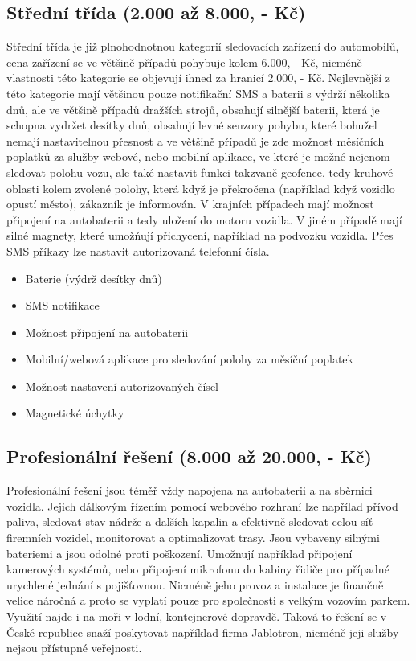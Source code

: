 \documentclass[FM,BP]{tulthesis}
\begin{document}
\subsection{Střední třída (2.000 až 8.000, - Kč)}
Střední třída je již plnohodnotnou kategorií sledovacích zařízení do automobilů, cena zařízení se ve většině případů pohybuje kolem 6.000, - Kč, nicméně vlastnosti této kategorie se objevují ihned za hranicí 2.000, - Kč. Nejlevnější z této kategorie mají většinou pouze notifikační SMS a baterii s výdrží několika dnů, ale ve většině případů dražších strojů, obsahují silnější baterii, která je schopna vydržet desítky dnů, obsahují levné senzory pohybu, které bohužel nemají nastavitelnou přesnost a ve většině případů je zde možnost měsíčních poplatků za služby webové, nebo mobilní aplikace, ve které je možné nejenom sledovat polohu vozu, ale také nastavit funkci takzvaně geofence, tedy kruhové oblasti kolem zvolené polohy, která když je překročena (například když vozidlo opustí město), zákazník je informován. V krajních případech mají možnost připojení na autobaterii a tedy uložení do motoru vozidla. V jiném případě mají silné magnety, které umožňují přichycení, například na podvozku vozidla. Přes SMS příkazy lze nastavit autorizovaná telefonní čísla.

\begin{itemize}
\item Baterie (výdrž desítky dnů)
\item SMS notifikace
\item Možnost připojení na autobaterii
\item Mobilní/webová aplikace pro sledování polohy za měsíční poplatek
\item Možnost nastavení autorizovaných čísel
\item Magnetické úchytky
\end{itemize}

\subsection{Profesionální řešení (8.000 až 20.000, - Kč)}
Profesionální řešení jsou téměř vždy napojena na autobaterii a na sběrnici vozidla. Jejich dálkovým řízením pomocí webového rozhraní lze napřílad přívod paliva, sledovat stav nádrže a dalších kapalin a efektivně sledovat celou síť firemních vozidel, monitorovat a optimalizovat trasy. Jsou vybaveny silnými bateriemi a jsou odolné proti poškození. Umožnují například připojení kamerových systémů, nebo připojení mikrofonu do kabiny řidiče pro případné urychlené jednání s pojišťovnou. Nicméně jeho provoz a instalace je finančně velice náročná a proto se vyplatí pouze pro společnosti s velkým vozovím parkem. Využití najde i na moři v lodní, kontejnerové dopravdě. Taková to řešení se v České republice snaží poskytovat například firma Jablotron, nicméně jeji služby nejsou přístupné veřejnosti.
\end{document}
